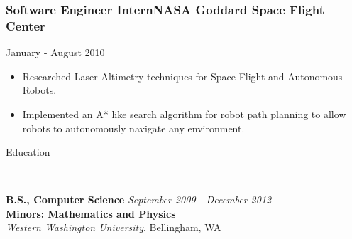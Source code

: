 \documentclass[9pt]{article}
\newenvironment{changemargin}[2]{%
  \begin{list}{}{%
    \setlength{\topsep}{0pt}%
    \setlength{\leftmargin}{#1}%
    \setlength{\rightmargin}{#2}%
    \setlength{\listparindent}{\parindent}%
    \setlength{\itemindent}{\parindent}%
    \setlength{\parsep}{\parskip}%
  }%
  \item[]}{\end{list}
}
\newcommand{\lineover}{
    \begin{changemargin}{-0.05in}{-0.05in}
        \vspace*{-8pt}
        \hrulefill \\
        \vspace*{-2pt}
    \end{changemargin}
}
\newcommand{\header}[1]{
    \begin{changemargin}{-0.5in}{-0.5in}
        {\large #1}\\
        \lineover
    \end{changemargin}
}
\newenvironment{body} {
    \vspace*{-16pt}
    \begin{changemargin}{-0.20in}{-0.5in}
  }
    {\end{changemargin}
}
\newenvironment{jobdescriptionlist}[3]{
  \subsubsection*{#1\hfill\small#2}
  \small
  \vspace*{-5pt}
  {\hfill #3}
  \vspace*{-10pt}
  \begin{itemize}
   \setlength{\topsep}{0pt}
   \setlength{\itemsep}{1pt}
   \setlength{\parskip}{0pt}
   \setlength{\parsep}{0pt}
}{\end{itemize}\vspace*{-3pt}\normalsize}
\begin{document}
\begin{body}
    \begin{jobdescriptionlist}{Software Engineer Intern}{NASA Goddard Space Flight Center}{January - August 2010}
        \item Researched Laser Altimetry techniques for Space Flight and Autonomous Robots.
        \item Implemented an A* like search algorithm for robot path planning to allow robots to autonomously navigate any environment.
    \end{jobdescriptionlist}



\end{body}

\vspace*{11pt}
\smallskip


\header{Education}

\begin{body}
    \vspace{14pt}

    \textbf{B.S., Computer Science}{} \hfill \emph{September 2009 - December 2012}{} \\
    \textbf{Minors: Mathematics and Physics}\\
    \emph{Western Washington University}, Bellingham, WA{} \\
    \medskip


\end{body}
\end{document}
